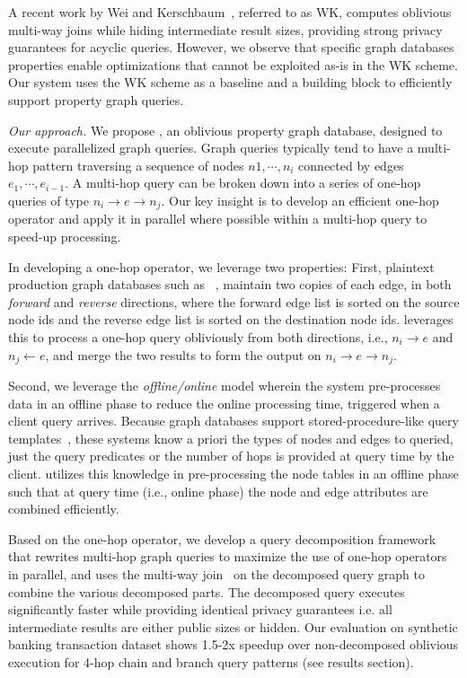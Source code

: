 A recent work by Wei and Kerschbaum~\cite{ruidi2025oblivious}, referred to as WK,
computes oblivious multi-way joins while hiding intermediate result sizes, providing 
strong privacy guarantees for acyclic queries. However, we observe that specific
graph databases properties enable optimizations that cannot be exploited as-is in
the WK scheme. Our system uses the WK scheme as a baseline and a building block
to efficiently support property graph queries.


\emph{Our approach.}
We propose \system, an oblivious property graph database, designed to execute 
parallelized graph queries. Graph queries typically tend to have a multi-hop pattern
traversing a sequence of nodes $n1,\cdots,n_i$ connected by edges $e_1,\cdots,
e_{i-1}$. A multi-hop query can be broken down into a series of one-hop queries of 
type $n_i \rightarrow e \rightarrow n_j$. Our key insight is to develop an efficient 
one-hop operator and apply it in parallel where possible within a multi-hop query to 
speed-up processing. 


In developing a one-hop operator, we leverage two properties: First, plaintext 
production
graph databases such as ~\cite{janusgraph, feng2023kuzu, deutsch2019tigergraph, sun2015sqlgraph}, maintain two copies of each edge, in both \textit{forward} and 
\textit{reverse} directions, where the forward edge list is sorted on the source
node ids and the reverse edge list is sorted on the destination node ids. \system
leverages this to process a one-hop query obliviously from both directions, i.e., 
$n_i \rightarrow e$ and $n_j \leftarrow e$, and merge the two results to form the
output on $n_i \rightarrow e \rightarrow n_j$.


Second, we leverage the \textit{offline/online} model wherein the system pre-processes
data in an offline phase to reduce the online processing time, triggered when a
client query arrives. Because graph databases support stored-procedure-like query
templates~\cite{deutsch2019tigergraph, neo4j, janusgraph, bebee2018amazon}, these
systems know a priori the types of nodes and edges to queried, just the query
predicates or the number of hops is provided at query time by the client. \system
utilizes this knowledge in pre-processing the node tables in an offline phase such
that at query time (i.e., online phase) the node and edge attributes are combined
efficiently.


Based on the one-hop operator, we develop a query decomposition framework that 
rewrites multi-hop graph queries to maximize the use of one-hop operators in 
parallel, and uses the multi-way join~\cite{ruidi2025oblivious} on the decomposed 
query graph to combine the various decomposed parts. The decomposed query executes 
significantly faster while providing identical privacy guarantees i.e. all 
intermediate results are either public sizes or hidden. Our evaluation on synthetic 
banking transaction dataset shows 1.5-2x speedup over non-decomposed oblivious execution for 4-hop chain and branch query patterns (see results section).